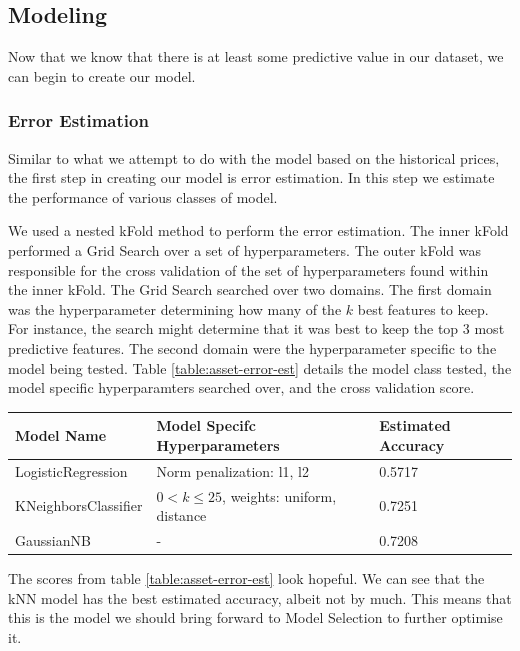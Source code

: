 \documentclass{report}
\begin{document}
\subsection{Modeling}

Now that we know that there is at least some predictive value in our dataset, we can begin to create our model.

\subsubsection{Error Estimation}

Similar to what we attempt to do with the model based on the historical prices, the first step in creating our model is error estimation. In this step we estimate the performance of various classes of model.

We used a nested kFold method to perform the error estimation. The inner kFold performed a Grid Search over a set of hyperparameters.  The outer kFold was responsible for the cross validation of the set of hyperparameters found within the inner kFold. The Grid Search searched over two domains. The first domain was the hyperparameter determining how many of the $k$ best features to keep. For instance, the search might determine that it was best to keep the top 3 most predictive features. The second domain were the hyperparameter specific to the model being tested. Table \ref{table:asset-error-est} details the model class tested, the model specific hyperparamters searched over, and the cross validation score.

\begin{center}
  
  \begin{tabular}{l | l | l}
	  \textbf{Model Name} & \textbf{Model Specifc Hyperparameters} & \textbf{Estimated Accuracy} \\ \hline
	  LogisticRegression & Norm penalization: l1, l2 & 0.5717 \\ \hline
	  KNeighborsClassifier & $0 < k \leq 25$, weights: uniform, distance & 0.7251 \\ \hline
	  GaussianNB & - & 0.7208
	  \label{table:asset-error-est}
  \end{tabular}
\end{center}

The scores from table \ref{table:asset-error-est} look hopeful. We can see that the kNN model has the best estimated accuracy, albeit not by much. This means that this is the model we should bring forward to Model Selection to further optimise it.
\end{document}
